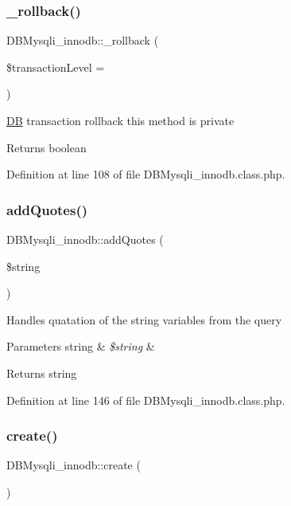 \subsubsection{\texorpdfstring{\+\_\+rollback()}{\_rollback()}}
{\footnotesize\ttfamily D\+B\+Mysqli\+\_\+innodb\+::\+\_\+rollback (\begin{DoxyParamCaption}\item[{}]{\$transaction\+Level = {} }\end{DoxyParamCaption})}

\hyperlink{classDB}{DB} transaction rollback this method is private \begin{DoxyReturn}{Returns}
boolean 
\end{DoxyReturn}


Definition at line 108 of file D\+B\+Mysqli\+\_\+innodb.\+class.\+php.

\hypertarget{classDBMysqli__innodb_aaf7572b62d23465db5d7bba8930004fc}{}\label{classDBMysqli__innodb_aaf7572b62d23465db5d7bba8930004fc} 
\subsubsection{\texorpdfstring{add\+Quotes()}{addQuotes()}}
{\footnotesize\ttfamily D\+B\+Mysqli\+\_\+innodb\+::add\+Quotes (\begin{DoxyParamCaption}\item[{}]{\$string }\end{DoxyParamCaption})}

Handles quatation of the string variables from the query 
\begin{DoxyParams}[1]{Parameters}
string & {\em \$string} & \\
\hline
\end{DoxyParams}
\begin{DoxyReturn}{Returns}
string 
\end{DoxyReturn}


Definition at line 146 of file D\+B\+Mysqli\+\_\+innodb.\+class.\+php.

\hypertarget{classDBMysqli__innodb_a70756f753a255650d67931f06d675608}{}\label{classDBMysqli__innodb_a70756f753a255650d67931f06d675608} 
\subsubsection{\texorpdfstring{create()}{create()}}
{\footnotesize\ttfamily D\+B\+Mysqli\+\_\+innodb\+::create (\begin{DoxyParamCaption}{ }\end{DoxyParamCaption})}


